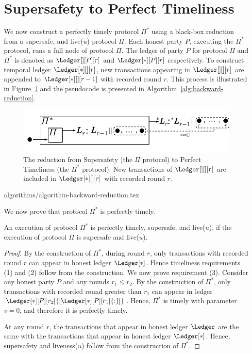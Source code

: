 \section{Supersafety to Perfect Timeliness}\label{sec:backward-reduction}

We now construct a perfectly timely protocol $\Pi^*$
using a black-box reduction from a supersafe, and live($u$) protocol $\Pi$.
Each honest party $P$, executing the $\Pi^*$ protocol, runs a
full node of protocol $\Pi$.
The ledger of party $P$ for protocol $\Pi$ and $\Pi^*$ is denoted as $\Ledger[][P][r]$ and
$\Ledger[*][P][r]$ respectively.
To construct temporal ledger $\Ledger[*][][r]$,
new transactions appearing in
$\Ledger[][][r]$ are appended to $\Ledger[*][][r - 1]$ with recorded round $r$.
This process is illustrated
in Figure~\ref{fig:backward-reduction}
and the pseudocode is presented in Algorithm~\ref{alg:backward-reduction}.

\begin{figure}
  \centering
  \includegraphics[width=0.9\columnwidth,keepaspectratio]{figures/backward-reduction.pdf}
  \caption{The reduction from Supersafety
    (the $\Pi$ protocol) to Perfect Timeliness (the $\Pi^*$ protocol).
    New transactions of $\Ledger[][][r]$ are included in
    $\Ledger[*][][r]$ with recorded round $r$.
  }
 \label{fig:backward-reduction}
\end{figure}

{algorithms/algorithm-backward-reduction.tex}

We now prove that protocol $\Pi^*$ is perfectly timely.

\begin{theorem}
  An execution of protocol $\Pi^*$ is perfectly timely, supersafe, and live($u$), if the execution of
  protocol $\Pi$ is supersafe and live($u$).
\end{theorem}
\begin{proof}
  By the construction of $\Pi^*$, during round $r$, only transactions with
  recorded round $r$ can appear in honest ledger $\Ledger[*]$.
  Hence timeliness requirements (1) and (2) follow from the construction.
  We now prove requirement (3).
  Consider any honest party $P$ and any rounds $r_1 \leq r_2$.
  By the construction of $\Pi^*$, only transactions with recorded round greater
  than $r_1$ can appear in ledger $\Ledger[*][P][r_2]{[\Ledger[*][P][r_1]{:}]}$.
  Hence, $\Pi^*$ is timely with parameter $v = 0$, and therefore it is perfectly timely.

  At any round $r$, the transactions that appear in honest ledger $\Ledger$
  are the same with the transactions that appear in honest ledger $\Ledger[*]$.
  Hence, supersafety and liveness($u$) follow from the construction of $\Pi^*$.
  \Qed
\end{proof}

